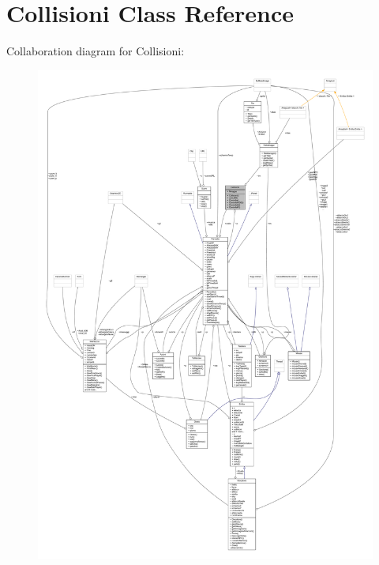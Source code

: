 \hypertarget{classa_1_1survival_1_1game_1_1_collisioni}{}\section{Collisioni Class Reference}
\label{classa_1_1survival_1_1game_1_1_collisioni}


Collaboration diagram for Collisioni\+:
\nopagebreak
\begin{figure}[H]
\begin{center}
\leavevmode
\includegraphics[width=350pt]{classa_1_1survival_1_1game_1_1_collisioni__coll__graph}
\end{center}
\end{figure}
